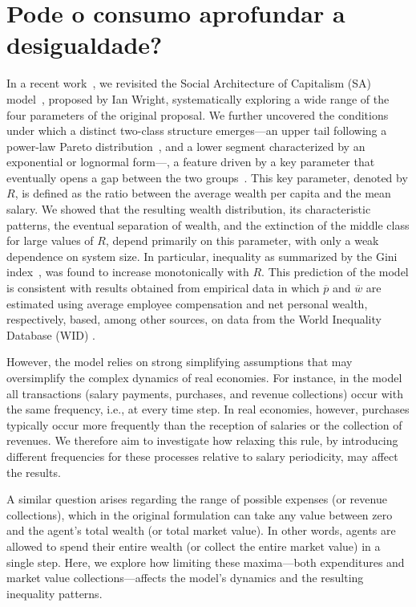 \newpage
\section{Pode o consumo aprofundar a desigualdade?} 

 
\label{sec:introduction}
In a recent work~\cite{Borba2025}, we revisited the Social Architecture of Capitalism (SA) model~\cite{WRIGHT2005589}, proposed by Ian Wright, systematically exploring a wide range of the four parameters of the original proposal. 
We further uncovered the conditions under which a distinct two-class structure emerges---an upper tail following a power-law Pareto distribution~\cite{dragulescu2001,yakovenko2023}, and a lower segment characterized by an exponential or lognormal form---, a feature driven by a key parameter that eventually opens a gap between the two groups~\cite{Borba2025}. 
This key parameter, denoted by $R$, is defined as the ratio between the average wealth per capita and the mean salary. 
We showed that the resulting wealth distribution, its characteristic patterns, the eventual separation of wealth, and the extinction of the middle class for large values of $R$, depend primarily on this parameter, with only a weak dependence on system size. 
In particular, inequality as summarized by the Gini index~\cite{PLATAPEREZ201579}, was found to increase  monotonically with $R$.  
This prediction of the model is consistent with results obtained from  empirical data in which $\overline{p}$ and  $\overline{w}$ are estimated using  average employee compensation and  net personal wealth, respectively, based, among other sources, on data from  the World Inequality Database (WID) \cite{WID}.
 
However, the model relies on strong simplifying assumptions that may oversimplify the complex dynamics of real economies. For instance, in the model all transactions (salary payments, purchases, and revenue collections) occur with the same frequency, i.e., at every time step. In real economies, however, purchases typically occur more frequently than the reception of salaries or the collection of revenues. We therefore aim to investigate how relaxing this rule, by introducing different frequencies for these processes relative to salary periodicity, may affect the results.

A similar question arises regarding the range of possible expenses (or revenue collections), which in the original formulation can take any value between zero and the agent’s total wealth (or total market value). In other words, agents are allowed to spend their entire wealth (or collect the entire market value) in a single step. Here, we explore how limiting these maxima—both expenditures and market value collections—affects the model’s dynamics and the resulting inequality patterns.

